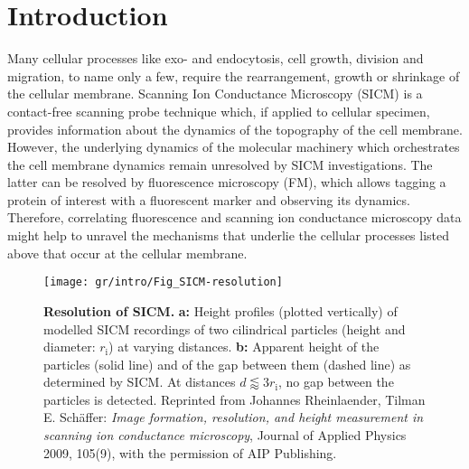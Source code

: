 \section{Introduction}
\label{sec:introduction}
Many cellular processes like exo- and endocytosis, cell growth, division and
migration, to name only a few, require the rearrangement, growth or shrinkage
of the cellular membrane. Scanning Ion Conductance Microscopy (SICM)
\cite{Hansma1989} is a contact-free scanning probe technique which, if applied
to cellular specimen, provides information about the dynamics of the
topography of the cell membrane. However, the underlying dynamics of the
molecular machinery which orchestrates the cell membrane dynamics remain
unresolved by SICM investigations. The latter can be resolved by fluorescence
microscopy (FM), which allows tagging a protein of interest with a fluorescent
marker and observing its dynamics. Therefore, correlating fluorescence and
scanning ion conductance microscopy data might help to unravel the mechanisms
that underlie the cellular processes listed above that occur at the cellular
membrane.

\begin{figure}[t]\centering
  \texttt{[image: gr/intro/Fig\_SICM-resolution]}
  \caption{\textbf{Resolution of SICM.}  \textbf{a:} Height profiles
    (plotted vertically) of modelled SICM recordings of two cilindrical
    particles (height and diameter: $r_\text{i}$) at varying
    distances. \textbf{b:} Apparent height of the particles (solid line) and of
    the gap between them (dashed line) as determined by SICM. At distances
    $d\lessapprox3r_\text{i}$, no gap between the particles is detected.
    Reprinted from Johannes Rheinlaender, Tilman E. Schäffer: \emph{Image
      formation, resolution, and height measurement in scanning ion
      conductance microscopy}, Journal of Applied Physics 2009, 105(9), with
    the permission of AIP Publishing.  }
  \label{fig:sicm-resolution}
\end{figure}
  
